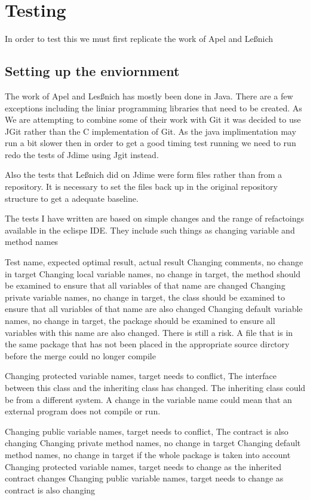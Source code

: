 
\chapter{Testing}
In order to test this we must first replicate the work of Apel and Le{\ss}nich

\section{Setting up the enviornment}
The work of Apel and Les{\ss}nich has mostly been done in Java.  There are a few exceptions including the liniar programming libraries that need to be created.  As We are attempting to combine some of their work with Git it was decided to use JGit rather than the C implementation of Git. As the java implimentation may run a bit slower then in order to get a good timing test running we need to run redo the tests of Jdime using Jgit instead. 

Also the tests that Le{\ss}nich did on Jdime were form files rather than from a repository. It is necessary to set the files back up in the original repository structure to get a adequate baseline.

The tests I have written are based on simple changes and the range of refactoings available in the eclispe IDE.  They include such things as changing variable and method names 

Test name, expected optimal result, actual result
Changing comments, no change in target
Changing local variable names, no change in target, the method should be examined to ensure that all variables of that name are changed
Changing private variable names, no change in target,  the class should be examined to ensure that all variables of that name are also changed
Changing default variable names, no change in target, the  package should be examined to ensure all variables with this name are also changed. There is still a risk. A file that is in the same package that has not been placed in the appropriate source dirctory before the merge could no longer compile
 
Changing protected variable names, target needs to conflict, The interface between this class and the inheriting class has changed.  The inheriting class could be from a different system.  A change in the variable name could mean that an external program does not compile or run.

Changing public variable names, target needs to conflict, The contract is also changing
Changing private method names, no change in target
Changing default method names, no change in target if the whole package is taken into account
Changing protected variable names, target needs to change as the inherited contract changes
Changing public variable names, target needs to change as contract is also changing 
